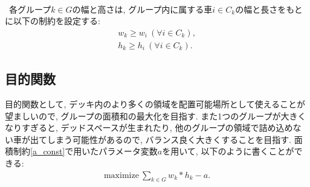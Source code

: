\\
\ 各グループ$k \in G$の幅と高さは, グループ内に属する車$i \in C_k$の幅と長さをもとに以下の制約を設定する: \\
\begin{eqnarray}
    w_k \geq w_i \ (\forall i \in C_k), \\
    h_k \geq h_i \ (\forall i \in C_k). 
\end{eqnarray}


\subsection{目的関数}
目的関数として, デッキ内のより多くの領域を配置可能場所として使えることが望ましいので, グループの面積和の最大化を目指す. 
また1つのグループが大きくなりすぎると, デッドスペースが生まれたり, 他のグループの領域で詰め込めない車が出てしまう可能性があるので, バランス良く大きくすることを目指す. 
面積制約\ref{a_const}で用いたパラメータ変数$a$を用いて, 以下のように書くことができる: \\
\begin{eqnarray}
    \mathrm{maximize}\ \sum_{k \in G} w_k*h_k  - a. 
\end{eqnarray}

